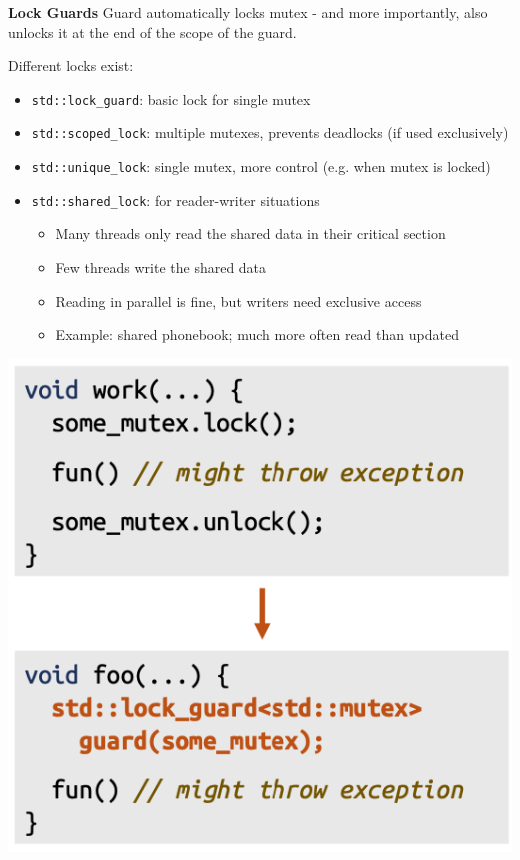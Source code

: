\vspace{-4pt}
\begin{sectionbox}
\textbf{Lock Guards}
Guard automatically locks mutex - and more importantly, also unlocks it at the end of the scope of the guard.

Different locks exist:
\begin{itemize}
    \item \lstinline{std::lock_guard}: basic lock for single mutex
    \item \lstinline{std::scoped_lock}: multiple mutexes, prevents deadlocks (if used exclusively)
    \item \lstinline{std::unique_lock}: single mutex, more control (e.g. when mutex is locked)
    \item \lstinline{std::shared_lock}: for reader-writer situations
    
    \begin{itemize}
        \item Many threads only read the shared data in their critical section
        \item Few threads write the shared data
        \item Reading in parallel is fine, but writers need exclusive access
        \item Example: shared phonebook; much more often read than updated
    \end{itemize}
\end{itemize}

\begin{center}
  \includegraphics[width=0.5 \columnwidth]{img/LockGuard.png}
\end{center}
\end{sectionbox}